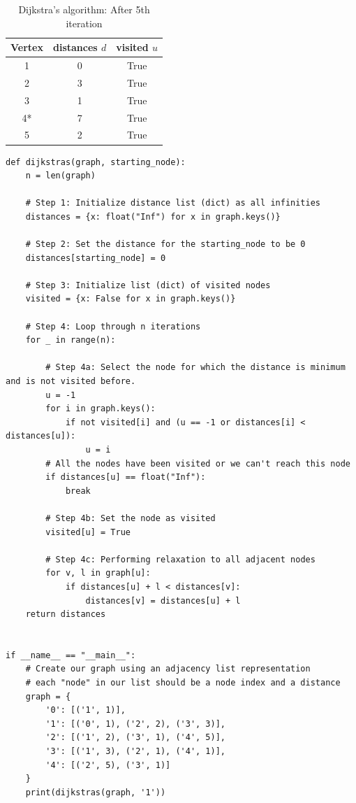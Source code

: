 \documentclass[a4paper,11pt]{book}
\begin{document}
\begin{table}[H]
\centering
\begin{tabular}{|c|c|c|}
\hline
\multicolumn{1}{|l|}{\textbf{Vertex}} & \textbf{distances  $d$} & \textbf{visited $u$} \\ \hline
1   & 0             & True     \\ 
2   & 3      & True     \\ 
3   & 1      & True     \\ 
4*   & 7      & True     \\ 
5   & 2      & True     \\ \hline
\end{tabular}
\caption{Dijkstra's algorithm: After 5th iteration}
\end{table}

\begin{lstlisting}
def dijkstras(graph, starting_node):
    n = len(graph)
    
    # Step 1: Initialize distance list (dict) as all infinities
    distances = {x: float("Inf") for x in graph.keys()}
    
    # Step 2: Set the distance for the starting_node to be 0
    distances[starting_node] = 0
    
    # Step 3: Initialize list (dict) of visited nodes
    visited = {x: False for x in graph.keys()}
    
    # Step 4: Loop through n iterations
    for _ in range(n):
        
        # Step 4a: Select the node for which the distance is minimum and is not visited before.
        u = -1
        for i in graph.keys():
            if not visited[i] and (u == -1 or distances[i] < distances[u]):
                u = i
        # All the nodes have been visited or we can't reach this node
        if distances[u] == float("Inf"):
            break
        
        # Step 4b: Set the node as visited
        visited[u] = True
        
        # Step 4c: Performing relaxation to all adjacent nodes
        for v, l in graph[u]:
            if distances[u] + l < distances[v]:
                distances[v] = distances[u] + l
    return distances


if __name__ == "__main__":
    # Create our graph using an adjacency list representation
    # each "node" in our list should be a node index and a distance
    graph = {
        '0': [('1', 1)],
        '1': [('0', 1), ('2', 2), ('3', 3)],
        '2': [('1', 2), ('3', 1), ('4', 5)],
        '3': [('1', 3), ('2', 1), ('4', 1)],
        '4': [('2', 5), ('3', 1)]
    }
    print(dijkstras(graph, '1'))
\end{lstlisting}
\end{document}
